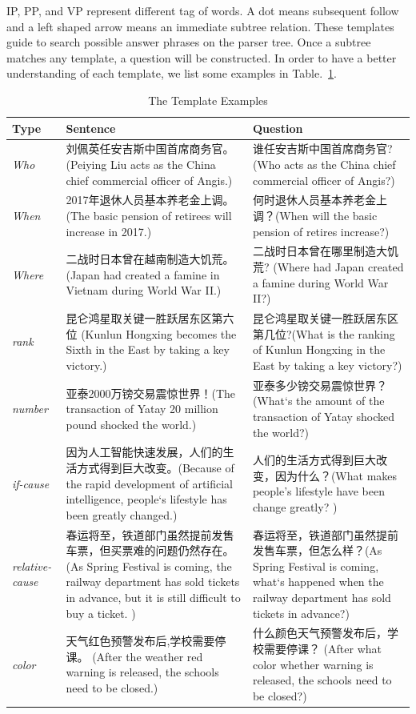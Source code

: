 \documentclass[runningheads,UTF8,article]{comsis2}
\newcommand\revised[1]{{\color{red} #1}}
\begin{document}
	IP, PP, and VP represent different tag of words. A dot means subsequent follow and a left shaped arrow means an immediate subtree relation. These templates guide to search possible answer phrases on the parser tree. Once a subtree matches any template, a question will be constructed.
	\revised{
	In order to have a better understanding of each template, we list some examples in Table.~\ref{example}.}
	
	
	\begin{table}[!ht]
		\centering
		\caption{The Template Examples}
		\setlength\tabcolsep{0.5em}
		\label{example}
		\begin{tabular}{|p{25pt}|p{155pt} | p{150pt} |}
			\hline
			Type& Sentence & Question \\
			\hline
			\emph{Who} & 刘佩英任安吉斯中国首席商务官。(Peiying Liu acts as the China chief commercial officer of Angis.) & 谁任安吉斯中国首席商务官?(Who acts as the China chief commercial officer of Angis?)\\
			\hline
			\emph{When} & 2017年退休人员基本养老金上调。(The basic pension of retirees will increase in 2017.) & 何时退休人员基本养老金上调？(When will the basic pension of retires increase?)  \\
			\hline
			\emph{Where} & 二战时日本曾在越南制造大饥荒。(Japan had created a famine in Vietnam during World War II.)& 二战时日本曾在哪里制造大饥荒?	(Where had Japan created a famine during World War II?) \\
			\hline
			\emph{rank}& 昆仑鸿星取关键一胜跃居东区第六位 (Kunlun Hongxing becomes the Sixth in the East by taking a key victory.)& 昆仑鸿星取关键一胜跃居东区第几位?(What is the ranking of Kunlun Hongxing in the East by taking a key victory?)\\
			\hline
			\emph{number}& 亚泰2000万镑交易震惊世界！(The transaction of Yatay 20 million pound shocked the world.)& 亚泰多少镑交易震惊世界？(What`s the amount of the transaction of Yatay shocked the world?) \\
			\hline
			\emph{if-cause}& 因为人工智能快速发展，人们的生活方式得到巨大改变。(Because of the rapid development of artificial intelligence, people`s lifestyle has been greatly changed.)&	人们的生活方式得到巨大改变，因为什么？(What makes people's lifestyle have been change greatly? )\\
			\hline
			\emph{relative-cause}& 春运将至，铁道部门虽然提前发售车票，但买票难的问题仍然存在。	(As Spring Festival is coming, the railway department has sold tickets in advance, but it is still difficult to buy a ticket. )&春运将至，铁道部门虽然提前发售车票，但怎么样？(As Spring Festival is coming, what`s happened when the railway department has sold tickets in advance?)\\
			
			\hline
			\emph{color} & 天气红色预警发布后,学校需要停课。 (After the weather red warning is released, the schools need to be closed.) &   什么颜色天气预警发布后，学校需要停课？ (After what color whether warning is released, the schools need to be closed?) \\ 
			\hline
		\end{tabular}
	\end{table}	
	
\end{document}
